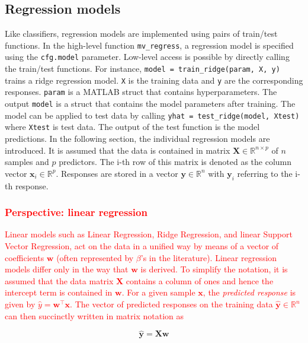 \documentclass[utf8]{frontiersSCNS} %
\newcommand{\w}{\mathbf{w}}
\newcommand{\x}{\mathbf{x}}
\newcommand{\y}{\mathbf{y}}
\newcommand{\yhat}{\widehat{\mathbf{y}}}
\newcommand{\R}{\mathbb{R}}
\newcommand{\X}{\mathbf{X}}
\newcommand{\ttt}[1]{\texttt{#1}}
\newcommand{\red}[1]{\textcolor{red}{#1}}
\begin{document}
\subsection{Regression models}\label{sec:regression}

Like classifiers, regression models are implemented using pairs of train/test functions. In the high-level function \ttt{mv\_regress}, a regression model is specified using the \ttt{cfg.model} parameter. Low-level access is possible by directly calling the train/test functions. For instance, \ttt{model = train\_ridge(param, X, y)} trains a ridge regression model. \ttt{X} is the training data and \ttt{y} are the corresponding responses. \ttt{param} is a MATLAB struct that contains hyperparameters. The output \ttt{model} is a struct that contains the model parameters after training. The model can be applied to test data by calling \ttt{yhat = test\_ridge(model, Xtest)} where \ttt{Xtest} is test data. The output of the test function is the model predictions. In the following section, the individual regression models are introduced. It is assumed that the data is contained in matrix $\X\in\R^{n \times p}$ of $n$ samples and $p$ predictors. The i-th row of this matrix is denoted as the column vector $\x_i\in\R^p$. Responses are stored in a vector $\y\in\R^n$ with $\y_i$ referring to the i-th response.

\subsubsection{\red{Perspective: linear  regression}}

\red{Linear models such as Linear Regression, Ridge Regression, and linear Support Vector Regression, act on the data in a unified way by means of a vector of coefficients $\w$ (often represented by $\beta$'s in the literature). Linear regression models differ only in the way that $\w$ is derived. To simplify the notation, it is assumed that the data matrix $\X$ contains a column of ones and hence the intercept term is contained in $\w$. For a given sample $\x$, the \textit{predicted response} is given by $\widehat{y} = \w^\top\x$. The vector of predicted responses on the training data $\yhat\in\R^n$ can then succinctly written in matrix notation as }

\begin{equation}
\label{eq:linreg_prediction}
\yhat = \X\w
\end{equation}
\end{document}
